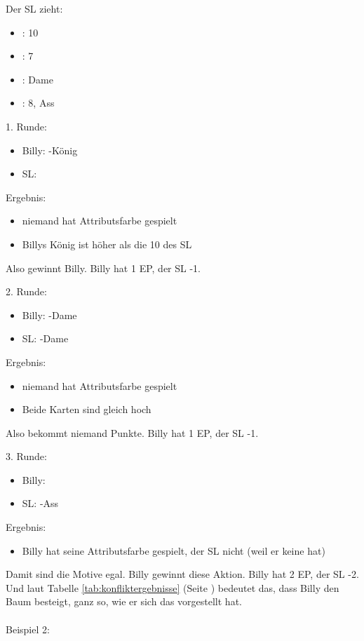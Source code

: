 Der SL zieht:
\begin {itemize}
\item \herz: 10
\item \karo: 7
\item \pik: Dame
\item \kreuz: 8, Ass
\end {itemize}

1. Runde:
\begin {itemize}
\item Billy: \herz-König
\item SL: 
\end {itemize}

Ergebnis:
\begin {itemize}
\item niemand hat Attributsfarbe gespielt
\item Billys König ist höher als die 10 des SL
\end {itemize}
Also gewinnt Billy. Billy hat 1 EP, der SL -1.

2. Runde:
\begin {itemize}
\item Billy: \pik-Dame
\item SL: \pik-Dame
\end {itemize}

Ergebnis:
\begin {itemize}
\item niemand hat Attributsfarbe gespielt
\item Beide Karten sind gleich hoch
\end {itemize}
Also bekommt niemand Punkte. Billy hat 1 EP, der SL -1.

3. Runde:
\begin {itemize}
\item Billy: 
\item SL: \kreuz-Ass
\end {itemize}

Ergebnis:
\begin {itemize}
\item Billy hat seine Attributsfarbe gespielt, der SL nicht (weil er keine hat)
\end {itemize}
Damit sind die Motive egal. Billy gewinnt diese Aktion. Billy hat 2 EP, der SL -2.
Und laut Tabelle \ref {tab:konfliktergebnisse} (Seite \pageref {tab:konfliktergebnisse})  bedeutet das, dass Billy den Baum besteigt, ganz so, wie er sich das vorgestellt hat.
\\
\\
Beispiel 2:

